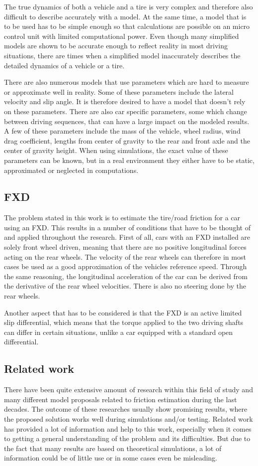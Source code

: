 The true dynamics of both a vehicle and a tire is very complex and therefore also difficult to describe accurately with a model. At the same time, a model that is to be used has to be simple enough so that calculations are possible on an micro control unit with limited computational power. Even though many simplified models are shown to be accurate enough to reflect reality in most driving situations, there are times when a simplified model inaccurately describes the detailed dynamics of a vehicle or a tire. 

There are also numerous models that use parameters which are hard to measure or approximate well in reality. Some of these parameters include the lateral velocity and slip angle. It is therefore desired to have a model that doesn't rely on these parameters. There are also car specific parameters, some which change between driving sequences, that can have a large impact on the modeled results. A few of these parameters include the mass of the vehicle, wheel radius, wind drag coefficient, lengths from center of gravity to the rear and front axle and the center of gravity height. When using simulations, the exact value of these parameters can be known, but in a real environment they either have to be static, approximated or neglected in computations.

\subsection{FXD}
The problem stated in this work is to estimate the tire/road friction for a car using an FXD. This results in a number of conditions that have to be thought of and applied throughout the research. First of all, cars with an FXD installed are solely front wheel driven, meaning that there are no positive longitudinal forces acting on the rear wheels. The velocity of the rear wheels can therefore in most cases be used as a good approximation of the vehicles reference speed. Through the same reasoning, the longitudinal acceleration of the car can be derived from the derivative of the rear wheel velocities. There is also no steering done by the rear wheels.

Another aspect that has to be considered is that the FXD is an active limited slip differential, which means that the torque applied to the two driving shafts can differ in certain situations, unlike a car equipped with a standard open differential.

\subsection{Related work}
There have been quite extensive amount of research within this field of study and many different model proposals related to friction estimation during the last decades. The outcome of these researches usually show promising results, where the proposed solution works well during simulations and/or testing. Related work has provided a lot of information and help to this work, especially when it comes to getting a general understanding of the problem and its difficulties. But due to the fact that many results are based on theoretical simulations, a lot of information could be of little use or in some cases even be misleading.

